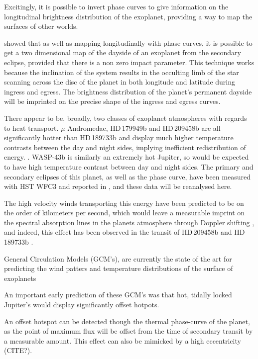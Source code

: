 \documentclass[a4paper,fleqn,usenatbib]{mnras}
\begin{document}
Excitingly, it is possible to invert phase curves to give information on the longitudinal brightness distribution of the exoplanet, providing a way to map the surfaces of other worlds. 

\cite{Majeau2012} showed that as well as mapping longitudinally with phase curves, it is possible to get a two dimensional map of the dayside of an exoplanet from the secondary eclipse, provided that there is a non zero impact parameter. This technique works because the inclination of the system results in the occulting limb of the star scanning across the disc of the planet in both longitude and latitude during ingress and egress. The brightness distribution of the planet's permanent dayside will be imprinted on the precise shape of the ingress and egress curves.

There appear to be, broadly, two classes of exoplanet atmospheres with regards to heat transport. $\mu$ Andromedae, HD\,179949b and HD\,209458b are all significantly hotter than HD\,189733b and display much higher temperature contrasts between the day and night sides, implying inefficient redistribution of energy. \citep{Harrington2006,Cowan2007,zellem2014}. WASP-43b is similarly an extremely hot Jupiter, so would be expected to have high temperature contrast between day and night sides. The primary and secondary eclipses of this planet, as well as the phase curve, have been measured with HST WFC3 and reported in \citep{Stevenson2014}, and these data will be reanalysed here.

The high velocity winds transporting this energy have been predicted to be on the order of kilometers per second, which would leave a measurable imprint on the spectral absorption lines in the planets atmosphere through Doppler shifting \citep[e.g.][]{Showman2013}, and indeed, this effect has been observed in the transit of HD\,209458b \citep{Snellen2010} and HD\,189733b \citep{Louden2015}. 

\citep[e.g.][]{Showman2015}

General Circulation Models (GCM's), are currently the state of the art for predicting the wind patters and temperature distributions of the surface of exoplanets \citep[e.g.][]{Showman2008}

An important early prediction of these GCM's was that hot, tidally locked Jupiter's would display significantly offset hotpots.

An offset hotspot can be detected though the thermal phase-curve of the planet, as the point of maximum flux will be offset from the time of secondary transit by a measurable amount. This effect can also be mimicked by a high eccentricity (CITE?). 
\end{document}
